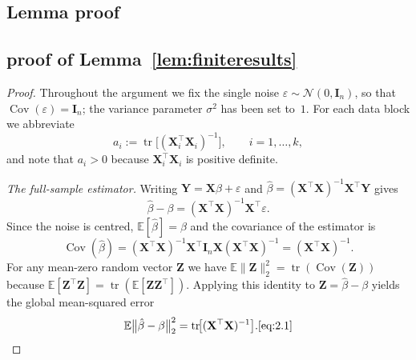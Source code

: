 \documentclass[11pt]{article}
\numberwithin{equation}{section}
\theoremstyle{plain}
\theoremstyle{definition}
\theoremstyle{remark}
\begin{document}
\begin{appendix}

\section{Lemma proof}





\subsection{proof of Lemma~\ref{lem:finiteresults}}
\begin{proof}
    Throughout the argument we fix the single noise
      $\varepsilon\sim\mathcal N(0,\mathbf{I}_n)$, so that
      $\operatorname{Cov}(\varepsilon)=\mathbf{I}_n$; the variance parameter
      $\sigma^{2}$ has been set to~$1$.
      For each data block we abbreviate
      \[
        a_i
        :=\operatorname{tr}\!\bigl[(\mathbf{X}_i^{\top}\mathbf{X}_i)^{-1}\bigr],
        \qquad i=1,\dots,k,
      \]
      and note that $a_i>0$ because $\mathbf{X}_i^{\top}\mathbf{X}_i$ is positive definite.

      \medskip
      \textit{The full-sample estimator.}
      Writing $\mathbf{Y}=\mathbf{X}\beta+\varepsilon$ and
      $\hat\beta=(\mathbf{X}^{\top}\mathbf{X})^{-1}\mathbf{X}^{\top}\mathbf{Y}$ gives
      \[
        \hat\beta-\beta
          =(\mathbf{X}^{\top}\mathbf{X})^{-1}\mathbf{X}^{\top}\varepsilon .
      \]
      Since the noise is centred, $\mathbb E[\hat\beta]=\beta$ and the
      covariance of the estimator is
      \[
        \operatorname{Cov}(\hat\beta)
          =(\mathbf{X}^{\top}\mathbf{X})^{-1}\mathbf{X}^{\top}\mathbf{I}_n\mathbf{X}(\mathbf{X}^{\top}\mathbf{X})^{-1}
          =(\mathbf{X}^{\top}\mathbf{X})^{-1}.
      \]
      For any mean-zero random vector $\mathbf{Z}$ we have
      $\mathbb E\|\mathbf{Z}\|_{2}^{2}=\operatorname{tr}(\operatorname{Cov}(\mathbf{Z}))$
      because
      $\mathbb E[\mathbf{Z}^{\top}\mathbf{Z}]=\operatorname{tr}(\mathbb E[\mathbf{Z}\mathbf{Z}^{\top}])$.
      Applying this identity to $\mathbf{Z}=\hat\beta-\beta$ yields the global
      mean-squared error
      \[
        \mathbb E\bigl\|\hat\beta-\beta\bigr\|_{2}^{2}
          =\operatorname{tr}\!\bigl[(\mathbf{X}^{\top}\mathbf{X})^{-1}\bigr].\ref{eq:2.1}
      \]


\end{proof}
\end{appendix}
\end{document}
